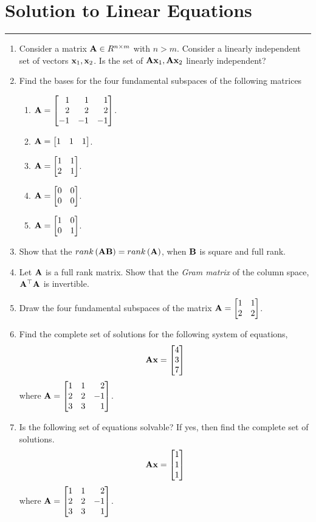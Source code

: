 \documentclass[
10pt, %
a4paper, %
oneside, %
headinclude,footinclude, %
BCOR5mm, %
]{scrartcl}
\def\mf{\ensuremath\mathbf}
\def\mb{\ensuremath\mathbb}
\def\bmx{\ensuremath\begin{bmatrix*}[r]}
\def\emx{\ensuremath\end{bmatrix*}}
\begin{document}
\newpage

\section{Solution to Linear Equations}
\hrule
\vspace{0.5cm}

\begin{enumerate}	
	\item Consider a matrix $\mf{A} \in \mb{}R^{n \times m}$ with $n > m$. Consider a linearly independent set of vectors $\mf{x}_1, \mf{x}_2$. Is the set of $\mf{A}\mf{x}_1, \mf{A}\mf{x}_2$ linearly independent?
	
	\item Find the bases for the four fundamental subspaces of the following matrices 
	\begin{enumerate}
		\item $\mf{A} = \bmx 1 & 1 & 1 \\ 2 & 2 & 2 \\ -1 & -1 & -1 \emx$.
		\item $\mf{A} = \bmx 1 & 1 & 1\emx$.
		\item $\mf{A} = \bmx 1 & 1 \\ 2 & 1\emx$.
		\item $\mf{A} = \bmx 0 & 0 \\ 0 & 0\emx$.
		\item $\mf{A} = \bmx 1 & 0 \\ 0 & 1\emx$.
	\end{enumerate}
	
	\item Show that the $rank\pp{\mf{A}\mf{B}} = rank\pp{\mf{A}}$, when $\mf{B}$ is square and full rank.

	\item Let $\mf{A}$ is a full rank matrix. Show that the \textit{Gram matrix} of the column space, $\mf{A}^\top\mf{A}$ is invertible.
	
	\item Draw the four fundamental subspaces of the matrix $\mf{A} = \bmx 1 & 1 \\ 2 & 2 \emx$.
	
	\item Find the complete set of solutions for the following system of equations,
	\[ \mf{A}\mf{x} = \bmx 4 \\ 3 \\ 7 \emx \]
	where $\mf{A} = \bmx 1 & 1 & 2\\ 2 & 2 & -1\\ 3 & 3 & 1\emx$.
	
	\item Is the following set of equations solvable? If yes, then find the complete set of solutions.
	\[ \mf{A}\mf{x} = \bmx 1 \\ 1 \\ 1 \emx \]
	where $\mf{A} = \bmx 1 & 1 & 2\\ 2 & 2 & -1\\ 3 & 3 & 1\emx$.
\end{enumerate}
\end{document}
